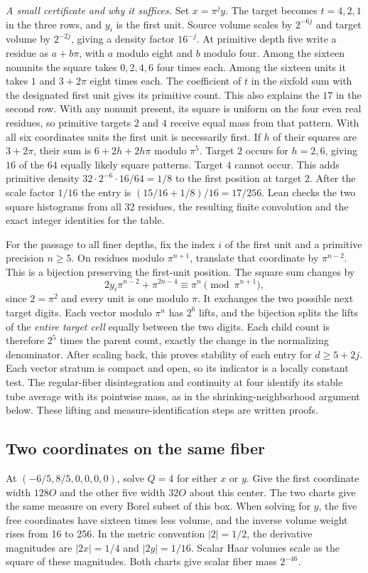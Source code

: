 \documentclass[12pt,letterpaper]{article}
\begin{document}
\textit{A small certificate and why it suffices.} Set $x=\pi^j y$. The target becomes $t=4,2,1$ in the three rows, and $y_i$ is the first unit. Source volume scales by $2^{-6j}$ and target volume by $2^{-2j}$, giving a density factor $16^{-j}$. At primitive depth five write a residue as $a+b\pi$, with $a$ modulo eight and $b$ modulo four. Among the sixteen nonunits the square takes $0,2,4,6$ four times each. Among the sixteen units it takes $1$ and $3+2\pi$ eight times each. The coefficient of $t$ in the sixfold sum with the designated first unit gives its primitive count. This also explains the $17$ in the second row. With any nonunit present, its square is uniform on the four even real residues, so primitive targets $2$ and $4$ receive equal mass from that pattern. With all six coordinates units the first unit is necessarily first. If $h$ of their squares are $3+2\pi$, their sum is $6+2h+2h\pi$ modulo $\pi^5$. Target $2$ occurs for $h=2,6$, giving $16$ of the $64$ equally likely square patterns. Target $4$ cannot occur. This adds primitive density $32\cdot 2^{-6}\cdot16/64=1/8$ to the first position at target $2$. After the scale factor $1/16$ the entry is $(15/16+1/8)/16=17/256$. Lean checks the two square histograms from all 32 residues, the resulting finite convolution and the exact integer identities for the table.

For the passage to all finer depths, fix the index $i$ of the first unit and a primitive precision $n\ge5$. On residues modulo $\pi^{n+1}$, translate that coordinate by $\pi^{n-2}$. This is a bijection preserving the first-unit position. The square sum changes by
\[
 2y_i\pi^{n-2}+\pi^{2n-4}\equiv\pi^n\pmod{\pi^{n+1}},
\]
since $2=\pi^2$ and every unit is one modulo $\pi$. It exchanges the two possible next target digits. Each vector modulo $\pi^n$ has $2^6$ lifts, and the bijection splits the lifts of the \emph{entire target cell} equally between the two digits. Each child count is therefore $2^5$ times the parent count, exactly the change in the normalizing denominator. After scaling back, this proves stability of each entry for $d\ge5+2j$. Each vector stratum is compact and open, so its indicator is a locally constant test. The regular-fiber disintegration and continuity at four identify its stable tube average with its pointwise mass, as in the shrinking-neighborhood argument below. These lifting and measure-identification steps are written proofs.

\subsection{Two coordinates on the same fiber}
At $(-6/5,8/5,0,0,0,0)$, solve $Q=4$ for either $x$ or $y$. Give the first coordinate width $128O$ and the other five width $32O$ about this center. The two charts give the same measure on every Borel subset of this box. When solving for $y$, the five free coordinates have sixteen times less volume, and the inverse volume weight rises from 16 to 256. In the metric convention $|2|=1/2$, the derivative magnitudes are $|2x|=1/4$ and $|2y|=1/16$. Scalar Haar volumes scale as the square of these magnitudes. Both charts give scalar fiber mass $2^{-46}$.
\end{document}
